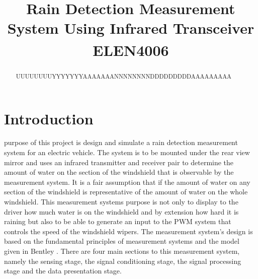 \documentclass[conference, 11pt]{IEEEtran}
\begin{document}
\title{Rain Detection Measurement System Using Infrared Transceiver\\
{\footnotesize \textsuperscript{}ELEN4006}
}

\author{
\and
{}
}

\maketitle

\begin{abstract}
UUUUUUUUYYYYYYYAAAAAAANNNNNNNNDDDDDDDDDAAAAAAAAA
\end{abstract}

\begin{IEEEkeywords}

\end{IEEEkeywords}

\section{Introduction}
 purpose of this project is design and simulate a rain detection measurement system for an electric vehicle. The system is to be mounted under the rear view mirror and uses an infrared transmitter and receiver pair to determine the amount of water on the section of the windshield that is observable by the measurement system. It is a fair assumption that if the amount of water on any section of the windshield is representative of the amount of water on the whole windshield.  This measurement systems purpose is not only to display to the driver how much water is on the windshield and by extension how hard it is raining but also to be able to generate an input to the PWM system that controls the speed of the windshield wipers. The measurement system's design is based on the fundamental principles of measurement systems and the model given in Bentley \cite{BENT}. There are four main sections to this measurement system, namely the sensing stage, the signal conditioning stage, the signal processing stage and the data presentation stage. \\
\end{document}
